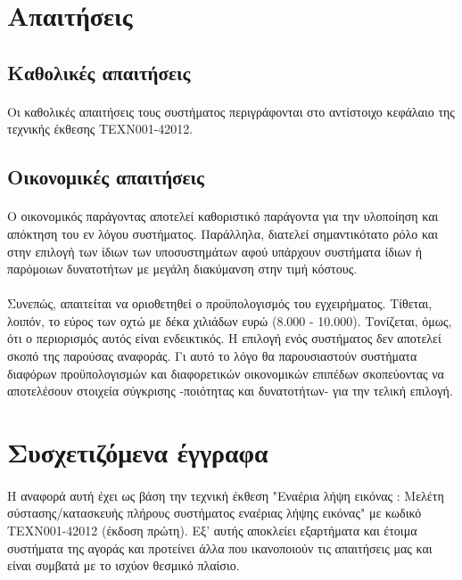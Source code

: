 \documentclass[a4paper, 12pt, twoside]{report}
\begin{document}
		\section{Απαιτήσεις}
		
		\subsection{Καθολικές απαιτήσεις}
			\paragraph{}{Οι καθολικές απαιτήσεις τους συστήματος περιγράφονται στο αντίστοιχο κεφάλαιο της τεχνικής έκθεσης ΤΕΧΝ001-42012.}
			
		\subsection{Οικονομικές απαιτήσεις}
			\paragraph{}{Ο οικονομικός παράγοντας αποτελεί καθοριστικό παράγοντα για την υλοποίηση και απόκτηση του εν λόγου συστήματος. Παράλληλα, διατελεί σημαντικότατο ρόλο και στην επιλογή των ίδιων των υποσυστημάτων αφού υπάρχουν συστήματα ίδιων ή παρόμοιων δυνατοτήτων με μεγάλη διακύμανση στην τιμή κόστους.
			}
			\paragraph{}{Συνεπώς, απαιτείται να οριοθετηθεί ο προϋπολογισμός του εγχειρήματος. Τίθεται, λοιπόν, το εύρος των οχτώ με δέκα χιλιάδων ευρώ (8.000 - 10.000). Τονίζεται, όμως, ότι ο περιορισμός αυτός είναι ενδεικτικός. Η επιλογή ενός συστήματος δεν αποτελεί σκοπό της παρούσας αναφοράς. Γι αυτό το λόγο θα παρουσιαστούν συστήματα διαφόρων προϋπολογισμών και διαφορετικών οικονομικών επιπέδων σκοπεύοντας να αποτελέσουν στοιχεία σύγκρισης -ποιότητας και δυνατοτήτων- για την τελική επιλογή.
			}
	
		\section{Συσχετιζόμενα έγγραφα}
			\paragraph{}{Η αναφορά αυτή έχει ως βάση την τεχνική έκθεση "Εναέρια λήψη εικόνας : Μελέτη σύστασης/κατασκευής πλήρους συστήματος εναέριας λήψης εικόνας" με κωδικό ΤΕΧΝ001-42012 (έκδοση πρώτη). Εξ' αυτής αποκλείει εξαρτήματα και έτοιμα συστήματα της αγοράς και προτείνει άλλα που ικανοποιούν τις απαιτήσεις μας και είναι συμβατά με το ισχύον θεσμικό πλαίσιο.
			}
	
\end{document}
